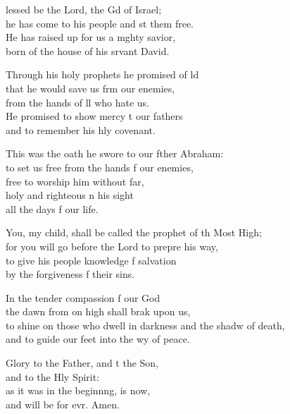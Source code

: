 \settowidth{\versewidth}{to shine on those who dwell in darkness and the shadow of death, *}
\begin{psalmverse}%
  \begin{patverse}
lessed be the Lord, the Gd of Israel;\Med\\
he has come to his people and st them free.\\
He has raised up for us a m\pointup{\i}ghty savior,\Med\\
born of the house of his srvant David.

Through his holy prophets he promised of ld\Flex\\
that he would save us frm our enemies,\Med\\
from the hands of ll who hate us.\\
He promised to show mercy t our fathers\Med\\
and to remember his hly covenant.

This was the oath he swore to our fther Abraham:\Med\\
to set us free from the hands f our enemies,\\
free to worship him without far,\Flex\\
holy and righteous \pointup{\i}n his sight\Med\\
all the days f our life.

You, my child, shall be called the prophet of th Most High;\Med\\
for you will go before the Lord to prepre his way,\\
to give his people knowledge f salvation\Med\\
by the forgiveness f their sins.

In the tender compassion f our God\Med\\
the dawn from on high shall brak upon us,\\
to shine on those who dwell in darkness and the shadw of death,\Med\\
and to guide our feet into the wy of peace.

Glory to the Father, and t the Son,\Med\\
and to the Hly Spirit:\\
as it was in the beginn\pointup{\i}ng, is now,\Med\\
and will be for evr. Amen.
  \end{patverse}
  \end{psalmverse}
